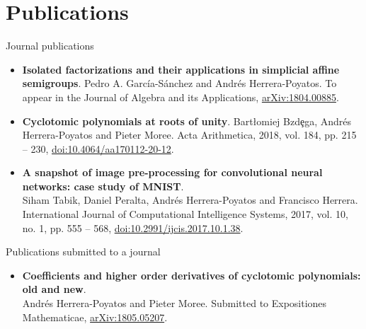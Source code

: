 \documentclass[10pt,a4paper,sans]{moderncv} %
\begin{document}

\vspace*{-3mm}
\section{Publications}


{\large \textcolor{color1}{Journal publications}}

	\begin{itemize}
	\item \textbf{Isolated factorizations and their applications in simplicial affine semigroups}.  Pedro A. Garc\'ia-S\'anchez and Andr\'es Herrera-Poyatos.  To appear in the Journal of Algebra and its Applications, \textcolor{colorl}{\href{https://arxiv.org/abs/1804.00885}{arXiv:1804.00885}}.
    \item \textbf{Cyclotomic polynomials at roots of unity}. Bart{\l}omiej Bzd\c{e}ga, Andrés Herrera-Poyatos and Pieter Moree. Acta Arithmetica, 2018, vol. 184, pp. 215 -- 230, \textcolor{colorl}{\href{https://www.impan.pl/en/publishing-house/journals-and-series/acta-arithmetica/all/184/3/112566/cyclotomic-polynomials-at-roots-of-unity}{doi:10.4064/aa170112-20-12}}. \\
	\item \textbf{A snapshot of image pre-processing for convolutional neural networks: case study of MNIST}. \\ Siham Tabik, Daniel Peralta, Andrés Herrera-Poyatos and Francisco Herrera. International Journal of Computational Intelligence Systems, 2017, vol. 10, no. 1, pp. 555 -- 568, \textcolor{colorl}{\href{http://www.atlantis-press.com/journals/ijcis/25867315}{doi:10.2991/ijcis.2017.10.1.38}}.
	\end{itemize}

{\large \textcolor{color1}{Publications submitted to a journal}}

\begin{itemize}
	\item \textbf{Coefficients and higher order derivatives of cyclotomic polynomials: old and new}. \\ Andr\'es Herrera-Poyatos and Pieter Moree.
	Submitted to Expositiones Mathematicae, \textcolor{colorl}{\href{https://arxiv.org/abs/1805.05207}{arXiv:1805.05207}}.
\end{itemize}
\end{document}
